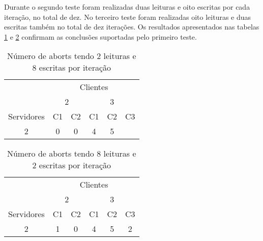 Durante o segundo teste foram realizadas duas leituras e oito escritas por cada iteração, no total de dez. No terceiro teste foram realizadas oito leituras e duas escritas também no total de dez iterações. Os resultados apresentados nas tabelas \ref{figBAborts} e \ref{figCAborts} confirmam as conclusões suportadas pelo primeiro teste.

\begin{table}[h]
\begin{tabular}{c|c|c|c|c|c|}
\cline{2-6}
                                 & \multicolumn{5}{c|}{Clientes}                   \\ \cline{2-6} 
                                 & \multicolumn{2}{c|}{2} & \multicolumn{3}{c|}{3} \\ \hline
\multicolumn{1}{|c|}{Servidores} & C1         & C2        & C1     & C2    & C3    \\ \hline
\multicolumn{1}{|c|}{2}          & 0          & 0         & 4      & 5     &       \\ \hline
\end{tabular}
\caption{Número de aborts tendo 2 leituras e 8 escritas por iteração} \label{figBAborts}
\end{table}

\begin{table}[h]
\begin{tabular}{c|c|c|c|c|c|}
\cline{2-6}
                                 & \multicolumn{5}{c|}{Clientes}                   \\ \cline{2-6} 
                                 & \multicolumn{2}{c|}{2} & \multicolumn{3}{c|}{3} \\ \hline
\multicolumn{1}{|c|}{Servidores} & C1         & C2        & C1     & C2    & C3    \\ \hline
\multicolumn{1}{|c|}{2}          & 1          & 0         & 4      & 5     & 2     \\ \hline
\end{tabular}
\caption{Número de aborts tendo 8 leituras e 2 escritas por iteração} \label{figCAborts}
\end{table}